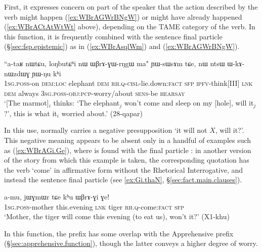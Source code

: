 First, it expresses concern on part of the speaker that the action described by the verb might happen (\ref{ex:WBrAGWrBNgW}) or might have already happened (\ref{ex:WBrACtAtWtWt} above), depending on the TAME category of the verb. In this function, it is frequently combined with the sentence final particle  (§\ref{sec:fsp.epistemic}) as in (\ref{ex:WBrAsqlWm}) and (\ref{ex:WBrAGWrBNgW}).
 
 \begin{exe}
\ex \label{ex:WBrAGWrBNgW}
\gll  ``a-taʁ nɯtɕu,  loŋbutɕʰi nɯ ɯβrɤ-ɣɯ-rŋgɯ ma" ɲɯ-sɯsɤm tɕe, nɯ ntsɯ ɯ-kɤ-nɯzdɯɣ ɲɯ-ŋu kʰi \\ 
\textsc{1sg}.\textsc{poss}-on \textsc{dem}:\textsc{loc} elephant \textsc{dem} \textsc{rh}.\textsc{q}-\textsc{cisl}-lie.down:\textsc{fact} \textsc{sfp} \textsc{ipfv}-think[III] \textsc{lnk} \textsc{dem} always \textsc{3sg}.\textsc{poss}-\textsc{obj}:\textsc{pcp}-worry/about \textsc{sens}-be \textsc{hearsay} \\
\glt `[The marmot]$_i$ thinks: `The elephant$_j$ won't come and sleep on my [hole], will it$_j$?', this is what it$_i$ worried about.' (28-qapar)
\end{exe}

In this use,  normally carries a negative presupposition `it will not $X$, will it?'. This negative meaning appears to be absent only  in a handful of examples such as (\ref{ex:WBrAGi.Ge}), where  is found with the final particle : in another version of the story from which this example is taken, the corresponding quotation has the verb  `come' in affirmative form without the Rhetorical Interrogative, and instead the sentence final particle  (see \ref{ex:Gi.thaN}, §\ref{sec:fact.main.clauses}).

\begin{exe}
\ex \label{ex:WBrAGi.Ge}
\gll  a-mu, jɯɣmɯr tɕe kʰu ɯβrɤ-ɣi ɣe! \\
\textsc{1sg}.\textsc{poss}-mother this.evening \textsc{lnk} tiger \textsc{rh}.\textsc{q}-come:\textsc{fact} \textsc{sfp} \\
\glt `Mother, the tiger will come this evening (to eat us), won't it?' (X1-khu)
\end{exe}
 
In this function, the prefix  has some overlap with the Apprehensive prefix  (§\ref{sec:apprehensive.function}), though the latter conveys a higher degree of worry.

